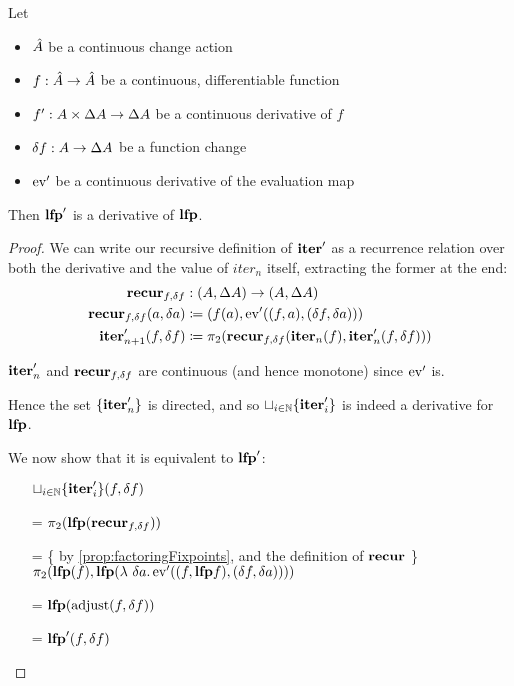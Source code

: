 \begin{thm}
  \label{thm:leastFixpointDiff}
  Let 
  \begin{itemize}
    \item $\hat{A}$ be a continuous change action
    \item $f : \hat{A} \rightarrow \hat{A}$ be a continuous, differentiable function
    \item $f' : A \times \Delta A \rightarrow \Delta A$ be a continuous derivative of $f$
    \item $\delta f : A \rightarrow \Delta A$ be a function change
    \item $\operatorname{ev}'$ be a continuous derivative of the evaluation map
  \end{itemize}
  Then $\textbf{lfp}'$ is a derivative of $\textbf{lfp}$.
\end{thm}
\ifproofs
\begin{proof}
  We can write our recursive definition of $\textbf{iter}'$ as a recurrence
  relation over both the derivative and the value of $iter_n$ itself, extracting
  the former at the end:
  \begin{align*}
    \textbf{recur}_{f, \delta f} &: (A, \Delta A) \rightarrow (A, \Delta A)\\
    \textbf{recur}_{f, \delta f} (a, \delta a) &\coloneqq (f(a), \operatorname{ev}'((f, a), (\delta f, \delta a)))\\
    \textbf{iter}_{n+1}'(f, \delta f) &\coloneqq \pi_2 (\textbf{recur}_{f, \delta f}(\textbf{iter}_n(f), \textbf{iter}'_n(f, \delta f)))
  \end{align*}

  $\textbf{iter}_n'$ and $\textbf{recur}_{f, \delta f}$ are continuous (and hence monotone) since $\operatorname{ev}'$ is.

  Hence the set $\{ \textbf{iter}'_n \}$ is directed, and so $\sqcup_{i \in \mathbb{N}}
  \{ \textbf{iter}_i' \}$ is indeed a derivative for $\textbf{lfp}$. 

  We now show that it is equivalent to $\textbf{lfp}'$:
  \begin{itemize}
    \item[ ]
      $\sqcup_{i \in \mathbb{N}} \{ \textbf{iter}_i' \}(f, \delta f)$
    \item[=]
      $\pi_2 (\textbf{lfp}(\textbf{recur}_{f, \delta f}))$
    \item[=]\{ by \cref{prop:factoringFixpoints}, and the definition of $\textbf{recur}$ \}\\
      $\pi_2 (\textbf{lfp}(f), \textbf{lfp} (\lambda\ \delta a. \operatorname{ev}'((f, \textbf{lfp} f), (\delta f, \delta a))))$
    \item[=]
      $\textbf{lfp}(\operatorname{adjust}(f, \delta f))$
    \item[=]
      $\textbf{lfp}'(f, \delta f)$
  \end{itemize}
\end{proof}
\fi

